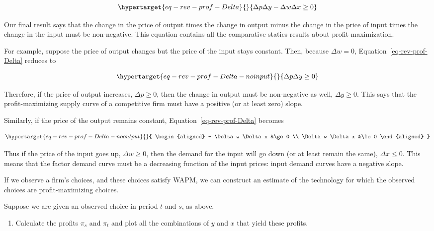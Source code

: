 \documentclass[
]{article}
\providecommand{\tightlist}{%
  \setlength{\itemsep}{0pt}\setlength{\parskip}{0pt}}\usepackage{longtable,booktabs,array}
\begin{document}
\begin{equation}\protect\hypertarget{eq-rev-prof-Delta}{}{
\Delta p \Delta y - \Delta w \Delta x \ge 0
}\label{eq-rev-prof-Delta}\end{equation}

Our final result says that the change in the price of output times the
change in output minus the change in the price of input times the change
in the input must be non-negative. This equation contains all the
comparative statics results about profit maximization.

For example, suppose the price of output changes but the price of the
input stays constant. Then, because \(\Delta w = 0\),
Equation~\ref{eq-rev-prof-Delta} reduces to

\begin{equation}\protect\hypertarget{eq-rev-prof-Delta-noinput}{}{
\Delta p \Delta y \ge 0
}\label{eq-rev-prof-Delta-noinput}\end{equation}

Therefore, if the price of output increases, \(\Delta p \ge 0\), then
the change in output must be non-negative as well, \(\Delta y \ge 0\).
This says that the profit-maximizing supply curve of a competitive firm
must have a positive (or at least zero) slope.

Similarly, if the price of the output remains constant,
Equation~\ref{eq-rev-prof-Delta} becomes

\begin{equation}\protect\hypertarget{eq-rev-prof-Delta-nooutput}{}{
\begin{aligned}
 - \Delta w \Delta x &\ge 0 \\
\Delta w \Delta x &\le 0
\end{aligned}
}\label{eq-rev-prof-Delta-nooutput}\end{equation}

Thus if the price of the input goes up, \(\Delta w \ge 0\), then the
demand for the input will go down (or at least remain the same),
\(\Delta x \le 0\). This means that the factor demand curve must be a
decreasing function of the input prices: input demand curves have a
negative slope.

If we observe a firm's choices, and these choices satisfy WAPM, we can
construct an estimate of the technology for which the observed choices
are profit-maximizing choices.

Suppose we are given an observed choice in period \(t\) and \(s\), as
above.

\begin{enumerate}
\def\labelenumi{\arabic{enumi}.}
\tightlist
\item
  Calculate the profits \(\pi_s\) and \(\pi_t\) and plot all the
  combinations of \(y\) and \(x\) that yield these profits.
\end{enumerate}
\end{document}
